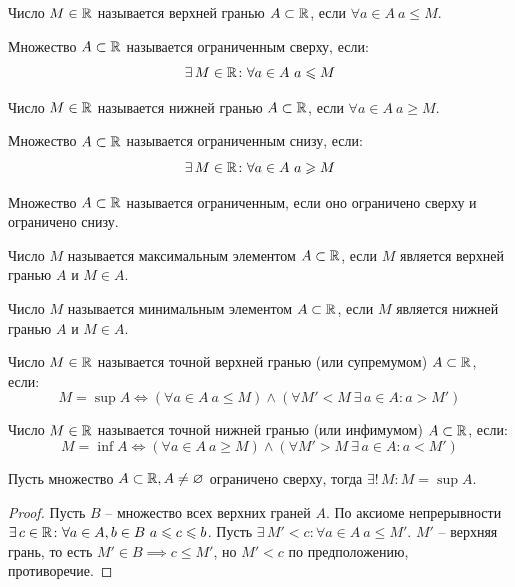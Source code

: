 \documentclass[12pt]{article}
\begin{document}
\begin{definition}
	Число $M\in \mathbb{R}$ называется верхней гранью $A\subset \mathbb{R}$, если
	$\forall a\in A\ a\leqslant M$.
\end{definition}
\begin{definition}
	Множество $A\subset \mathbb{R}$ называется ограниченным сверху, если:
	\[\exists\,M\in\mathbb{R}\colon \forall a\in A\ a\leqslant M\]
\end{definition}
\begin{definition}
	Число $M\in \mathbb{R}$ называется нижней гранью $A\subset \mathbb{R}$, если
	$\forall a\in A\ a\geqslant M$.
\end{definition}
\begin{definition}
	Множество $A\subset \mathbb{R}$ называется ограниченным снизу, если:
	\[\exists\,M\in\mathbb{R}\colon \forall a\in A\ a\geqslant M\]
\end{definition}
\begin{definition}
	Множество $A\subset \mathbb{R}$ называется ограниченным, если оно ограничено
	сверху и ограничено снизу.
\end{definition}
\begin{definition}
	Число $M$ называется максимальным элементом $A\subset \mathbb{R}$, если $M$
	является верхней гранью $A$ и $M\in A$.
\end{definition}
\begin{definition}
	Число $M$ называется минимальным элементом $A\subset \mathbb{R}$, если $M$
	является нижней гранью $A$ и $M\in A$.
\end{definition}
\begin{definition}
	Число $M\in \mathbb{R}$ называется точной верхней гранью (или супремумом)
	$A\subset \mathbb{R}$, если:
	\[M=\sup A\iff (\forall a\in A\ a\leqslant M) \land (\forall M'<M\
	\exists\,a\in A\colon a>M')\]
\end{definition}
\begin{definition}
	Число $M\in \mathbb{R}$ называется точной нижней гранью (или инфимумом)
	$A\subset \mathbb{R}$, если:
	\[M=\inf A\iff (\forall a\in A\ a\geqslant M) \land (\forall M'>M\
	\exists\,a\in A\colon a<M')\]
\end{definition}
\begin{theorem}
	Пусть множество $A\subset\mathbb{R}, A\neq\varnothing$ ограничено сверху,
	тогда $\exists!\,M\colon M=\sup A$.
	\begin{proof}
		Пусть $B$ -- множество всех верхних граней $A$. По аксиоме
		непрерывности $\exists\,c\in \mathbb{R}\colon \forall a\in A, b\in B\ a\leqslant
		c\leqslant b$. Пусть $\exists\,M'<c\colon \forall a\in A\ a\leqslant M'$.
		$M'$ -- верхняя грань, то есть $M'\in B\implies c\leqslant M'$, но
		$M'<c$ по предположению, противоречие.
	\end{proof}
\end{theorem}
\end{document}

